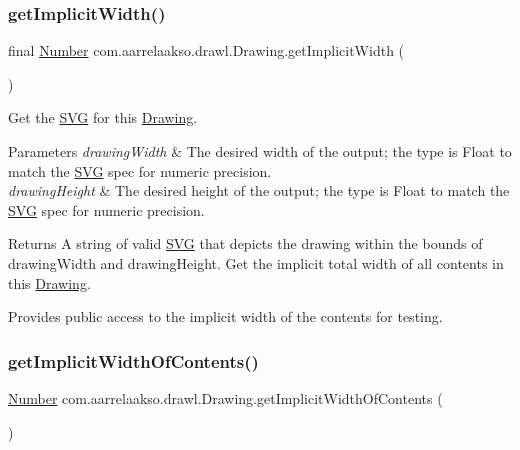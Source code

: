 \subsubsection{\texorpdfstring{get\+Implicit\+Width()}{getImplicitWidth()}}
{\footnotesize\ttfamily final \hyperlink{interfacecom_1_1aarrelaakso_1_1drawl_1_1_number}{Number} com.\+aarrelaakso.\+drawl.\+Drawing.\+get\+Implicit\+Width (\begin{DoxyParamCaption}{ }\end{DoxyParamCaption})}



Get the \hyperlink{classcom_1_1aarrelaakso_1_1drawl_1_1_s_v_g}{S\+VG} for this \hyperlink{classcom_1_1aarrelaakso_1_1drawl_1_1_drawing}{Drawing}. 


\begin{DoxyParams}{Parameters}
{\em drawing\+Width} & The desired width of the output; the type is Float to match the \hyperlink{classcom_1_1aarrelaakso_1_1drawl_1_1_s_v_g}{S\+VG} spec for numeric precision. \\
\hline
{\em drawing\+Height} & The desired height of the output; the type is Float to match the \hyperlink{classcom_1_1aarrelaakso_1_1drawl_1_1_s_v_g}{S\+VG} spec for numeric precision. \\
\hline
\end{DoxyParams}
\begin{DoxyReturn}{Returns}
A string of valid \hyperlink{classcom_1_1aarrelaakso_1_1drawl_1_1_s_v_g}{S\+VG} that depicts the drawing within the bounds of drawing\+Width and drawing\+Height. Get the implicit total width of all contents in this \hyperlink{classcom_1_1aarrelaakso_1_1drawl_1_1_drawing}{Drawing}. 
\end{DoxyReturn}
Provides public access to the implicit width of the contents for testing. \mbox{\label{classcom_1_1aarrelaakso_1_1drawl_1_1_drawing_a6434cc250ea5526a5778408aef18d293}} 
\subsubsection{\texorpdfstring{get\+Implicit\+Width\+Of\+Contents()}{getImplicitWidthOfContents()}}
{\footnotesize\ttfamily \hyperlink{interfacecom_1_1aarrelaakso_1_1drawl_1_1_number}{Number} com.\+aarrelaakso.\+drawl.\+Drawing.\+get\+Implicit\+Width\+Of\+Contents (\begin{DoxyParamCaption}{ }\end{DoxyParamCaption})\hspace{0.3cm}{\ttfamily [package]}}



